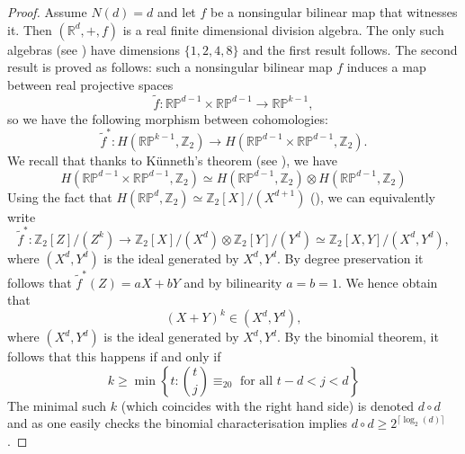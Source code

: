 \documentclass[11pt, a4paper, reqno]{elsarticle}
\theoremstyle{definition}
\theoremstyle{remark}
\begin{document}
\begin{proof}
Assume $N(d)=d$ and let $f$ be a nonsingular bilinear map
that witnesses it.
Then  $(\mathbb{R}^d, +, f)$ is a real 
finite dimensional division algebra.
The only such algebras (see \cite[corollary 1]{Bott})
 have dimensions $\{1,2,4,8\}$ and the first
result follows.
The second result is proved as follows:
such a nonsingular bilinear map $f$ induces a map between real projective spaces
\begin{equation*}
	\tilde f\colon
	\mathbb{R}\mathbb P^{d-1}
\times
	\mathbb{R} \mathbb P^{d-1}
\to
	\mathbb{R}\mathbb P^{k-1},
\end{equation*}
so we have the following morphism between cohomologies:
\begin{equation*}
    \tilde f^*\colon 
    H(\mathbb R\mathbb P^{k-1}, \mathbb Z_2)\to 
	H(\mathbb R\mathbb P^{d-1}\times \mathbb{R} \mathbb P^{d-1}, \mathbb Z_2).
\end{equation*}
We recall that thanks to Künneth's theorem
(see \cite[Theorem 3.15]{hatcher2002algebraic}), we have
\begin{equation*}
H(\mathbb R\mathbb P^{d-1}\times \mathbb{R} \mathbb P^{d-1}, \mathbb Z_2)\simeq
H(\mathbb R\mathbb P^{d-1}, \mathbb Z_2)\otimes H(\mathbb R\mathbb P^{d-1}, \mathbb Z_2)
\end{equation*}
Using the fact that $H(\mathbb R\mathbb P^d, \mathbb Z_2)
\simeq \mathbb Z_2[X]/(X^{d+1})$
(\cite[Theorem 3.19]{hatcher2002algebraic}), we can equivalently write
\begin{equation*}
	\tilde f^*\colon 
	\mathbb Z_2[Z]/(Z^{k})
    \to 
    \mathbb Z_2[X]/(X^{d})
\otimes
	\mathbb Z_2[Y]/(Y^{d})\simeq \mathbb Z_2[X,Y]/(X^d,Y^d),
\end{equation*}
where $(X^d,Y^d)$ is the ideal
generated by $X^d, Y^d$.
By degree preservation
it follows that $\tilde f^*(Z)=aX+bY$ 
and by bilinearity $a=b=1$. We hence obtain that
\begin{equation*}
	(X+Y)^{k}
\in
	(X^d,Y^d),
\end{equation*}
where $(X^d, Y^d)$ is the ideal generated by $X^d, Y^d.$ By the binomial
theorem, it follows that this happens
if and only if
\begin{equation*}
    k\ge \min \left\{t\colon  \binom{t}{j}\equiv_20\text{ for all
    }t-d<j<d\right\}
\end{equation*}
The minimal such $k$ 
(which coincides with the right hand side) is denoted $d\circ d$ and
as one easily checks the binomial
characterisation implies $d\circ d\ge 2^{\lceil\log_2(d)\rceil}$.
\end{proof}
\end{document}
